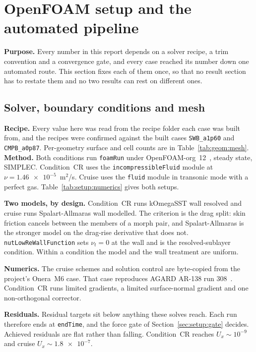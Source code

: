 \section{OpenFOAM setup and the automated pipeline}
\label{sec:method}

\textbf{Purpose.} Every number in this report depends on a solver recipe, a trim convention and a
convergence gate, and every case reached its number down one automated route. This section fixes
each of them once, so that no result section has to restate them and no two results can rest on
different ones.
\subsection{Solver, boundary conditions and mesh}
\label{sec:setup}
\label{sec:setup:solver}

\textbf{Recipe.} Every value here was read from the recipe folder each case was built from, and
the recipes were confirmed against the built cases \texttt{SWB\_a1p60} and \texttt{CMPB\_a0p87}.
Per-geometry surface and cell counts are in Table~\ref{tab:geom:mesh}.
\textbf{Method.} Both conditions run \texttt{foamRun} under OpenFOAM-org~12~\cite{openfoam},
steady state, SIMPLEC. Condition~CR uses the \texttt{incompressibleFluid} module at
$\nu = \num{1.46e-5}$~m$^2$/s. Cruise uses the \texttt{fluid} module in transonic mode with a
perfect gas. Table~\ref{tab:setup:numerics} gives both setups.

\textbf{Two models, by design.} Condition~CR runs kOmegaSST wall resolved and cruise runs
Spalart-Allmaras wall modelled. The criterion is the drag split: skin friction cancels between
the members of a morph pair, and Spalart-Allmaras is the stronger model on the drag-rise
derivative that does not. \texttt{nutLowReWallFunction} sets $\nu_t = 0$ at the wall and is the
resolved-sublayer condition. Within a condition the model and the wall treatment are uniform.

\textbf{Numerics.} The cruise schemes and solution control are byte-copied from the project's
Onera~M6 case. That case reproduces AGARD AR-138 run 308~\cite{agard138}. Condition~CR runs
limited gradients, a limited surface-normal gradient and one non-orthogonal corrector.

\textbf{Residuals.} Residual targets sit below anything these solves reach. Each run therefore
ends at \texttt{endTime}, and the force gate of Section~\ref{sec:setup:gate} decides. Achieved
residuals are flat rather than falling. Condition~CR reaches $U_x \sim 10^{-9}$ and cruise
$U_x \sim \num{1.8e-7}$.

